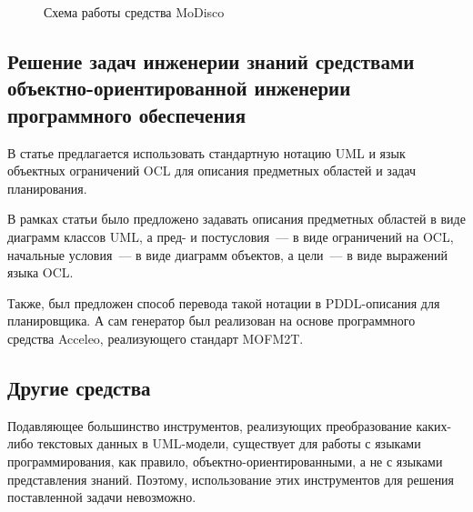 \documentclass[a4paper,14pt]{extreport}
\begin{document}
    \begin{figure}[h]
        \caption{Схема работы средства MoDisco}
        \label{img:modisco_overview}

    \end{figure}    

\subsection*{Решение задач инженерии знаний средствами объектно-ориентированной  инженерии программного обеспечения}    

В статье \cite{mal-manz} предлагается использовать стандартную нотацию UML и язык объектных ограничений OCL для описания предметных областей и задач планирования.

В рамках статьи было предложено задавать описания предметных областей в виде диаграмм классов UML, а пред- и постусловия~--- в виде ограничений на OCL, начальные условия~--- в виде диаграмм объектов, а цели~--- в виде выражений языка OCL.
 
Также, был предложен способ перевода такой нотации в PDDL-описания для планировщика.
 А сам генератор был реализован на основе программного средства Acceleo, реализующего стандарт MOFM2T\cite{mofm2t}.
 
    
\subsection*{Другие средства}
     Подавляющее большинство инструментов, реализующих преобразование каких-либо текстовых данных в UML-модели, существует для работы с языками программирования, как правило, объектно-ориентированными, а не с языками представления знаний.
 Поэтому, использование этих инструментов для решения поставленной задачи невозможно.
  
\end{document}
